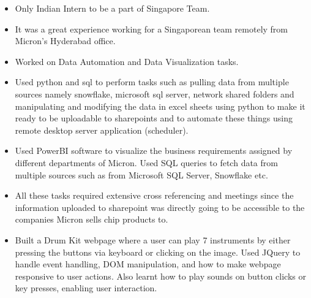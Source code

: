 \documentclass[10pt,a4paper,ragged2e,withhyper]{altacv}
\begin{document}
\begin{paracol}{2}

\begin{itemize}
\item Only Indian Intern to be a part of Singapore Team.
\item It was a great experience working for a Singaporean team remotely from Micron's Hyderabad office.
\item Worked on Data Automation and Data Visualization tasks.
\item Used python and sql to perform tasks such as pulling data from multiple sources namely snowflake, microsoft sql server, network shared folders and manipulating and modifying the data in excel sheets using python to make it ready to be uploadable to sharepoints and to automate these things using remote desktop server application (scheduler).
\item Used PowerBI software to visualize the business requirements assigned by different departments of Micron. Used SQL queries to fetch data from multiple sources such as from Microsoft SQL Server, Snowflake etc.
\item All these tasks required extensive cross referencing and meetings since the information uploaded to sharepoint was directly going to be accessible to the companies Micron sells chip products to.
\end{itemize}




\begin{itemize}
\item Built a Drum Kit webpage where a user can play 7 instruments by either pressing the buttons via keyboard or clicking on the image. Used JQuery to handle event handling, DOM manipulation, and how to make webpage responsive to user actions. Also learnt how to play sounds on button clicks or key presses, enabling user interaction.
\end{itemize}


\end{paracol}
\end{document}
